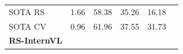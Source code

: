 \begin{table}[h!tb]
\begin{tabular}{l *5{S[table-format=2.2]}}
        \ac{SOTA} \ac{RS} & 1.66 & 58.38 & 35.26 & 16.18 \\
        \ac{SOTA} \ac{CV} & 0.96 & 61.96 & 37.55 & 31.73  \\
        \midrule
        \textbf{RS-InternVL} &  &  &  &  \\
        \bottomrule
    \end{tabular}
    \label{tab:main_ours}
\end{table}